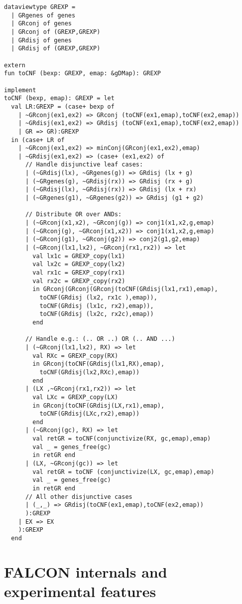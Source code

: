\begin{verbatim}
dataviewtype GREXP = 
  | GRgenes of genes
  | GRconj of genes
  | GRconj of (GREXP,GREXP)
  | GRdisj of genes
  | GRdisj of (GREXP,GREXP)

extern
fun toCNF (bexp: GREXP, emap: &gDMap): GREXP

implement
toCNF (bexp, emap): GREXP = let     
  val LR:GREXP = (case+ bexp of 
    | ~GRconj(ex1,ex2) => GRconj (toCNF(ex1,emap),toCNF(ex2,emap))
    | ~GRdisj(ex1,ex2) => GRdisj (toCNF(ex1,emap),toCNF(ex2,emap))   
    | GR => GR):GREXP
  in (case+ LR of  
    | ~GRconj(ex1,ex2) => minConj(GRconj(ex1,ex2),emap) 
    | ~GRdisj(ex1,ex2) => (case+ (ex1,ex2) of
      // Handle disjunctive leaf cases:         
      | (~GRdisj(lx), ~GRgenes(g)) => GRdisj (lx + g) 
      | (~GRgenes(g), ~GRdisj(rx)) => GRdisj (rx + g)
      | (~GRdisj(lx), ~GRdisj(rx)) => GRdisj (lx + rx)
      | (~GRgenes(g1), ~GRgenes(g2)) => GRdisj (g1 + g2)

      // Distribute OR over ANDs:
      | (~GRconj(x1,x2), ~GRconj(g)) => conj1(x1,x2,g,emap) 
      | (~GRconj(g), ~GRconj(x1,x2)) => conj1(x1,x2,g,emap) 
      | (~GRconj(g1), ~GRconj(g2)) => conj2(g1,g2,emap)
      | (~GRconj(lx1,lx2), ~GRconj(rx1,rx2)) => let
        val lx1c = GREXP_copy(lx1)
        val lx2c = GREXP_copy(lx2) 
        val rx1c = GREXP_copy(rx1)
        val rx2c = GREXP_copy(rx2) 
        in GRconj(GRconj(GRconj(toCNF(GRdisj(lx1,rx1),emap), 
          toCNF(GRdisj (lx2, rx1c ),emap)),
          toCNF(GRdisj (lx1c, rx2),emap)), 
          toCNF(GRdisj (lx2c, rx2c),emap)) 
        end

      // Handle e.g.: (.. OR ..) OR (.. AND ...) 
      | (~GRconj(lx1,lx2), RX) => let
        val RXc = GREXP_copy(RX)
        in GRconj(toCNF(GRdisj(lx1,RX),emap),
          toCNF(GRdisj(lx2,RXc),emap)) 
        end
      | (LX ,~GRconj(rx1,rx2)) => let
        val LXc = GREXP_copy(LX)
        in GRconj(toCNF(GRdisj(LX,rx1),emap),
          toCNF(GRdisj(LXc,rx2),emap)) 
        end
      | (~GRconj(gc), RX) => let
        val retGR = toCNF(conjunctivize(RX, gc,emap),emap)
        val _ = genes_free(gc)
        in retGR end
      | (LX, ~GRconj(gc)) => let
        val retGR = toCNF (conjunctivize(LX, gc,emap),emap)
        val _ = genes_free(gc)
        in retGR end
      // All other disjunctive cases
      | (_,_) => GRdisj(toCNF(ex1,emap),toCNF(ex2,emap))
      ):GREXP
    | EX => EX
    ):GREXP
  end
\end{verbatim}

\section{FALCON internals and experimental features}
\label{sec:internals}


